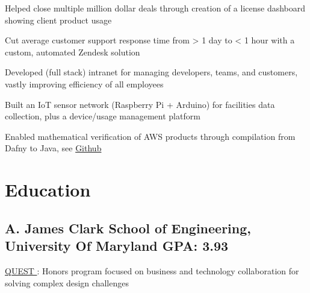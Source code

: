 \documentclass[print]{jack-resume}
\begin{document}
\begin{tightemize}
    \item Helped close multiple million dollar deals through creation of a license dashboard showing client product usage
    \item Cut average customer support response time from > 1 day to < 1 hour with a custom, automated Zendesk solution
    \item Developed (full stack) intranet for managing developers, teams, and customers, vastly improving efficiency of all employees
\end{tightemize}
\sectionsep

\begin{tightemize}
    \item Built an IoT sensor network (Raspberry Pi + Arduino) for facilities data collection, plus a device/usage management platform
\end{tightemize}

\begin{tightemize}
    \item Enabled mathematical verification of AWS products through compilation from Dafny to Java, see \href{https://github.com/dafny-lang/dafny}{Github \ExternalLink}
\end{tightemize}
\sectionsep

\section{Education}
\subsection{A. James Clark School of Engineering, University Of Maryland \hfill GPA: 3.93}
 \hfill
\begin{tightemize}
    \item \color{darkmodePrimary}\href{https://www.rhsmith.umd.edu/programs/undergraduate-programs/academics/fellows-special-programs/quest}{QUEST \ExternalLink}: Honors program focused on business and technology collaboration for solving complex design challenges
\end{tightemize}

\begin{minipage}[t]{0.04\textwidth}
    \hfill
\end{minipage}
\end{document}
